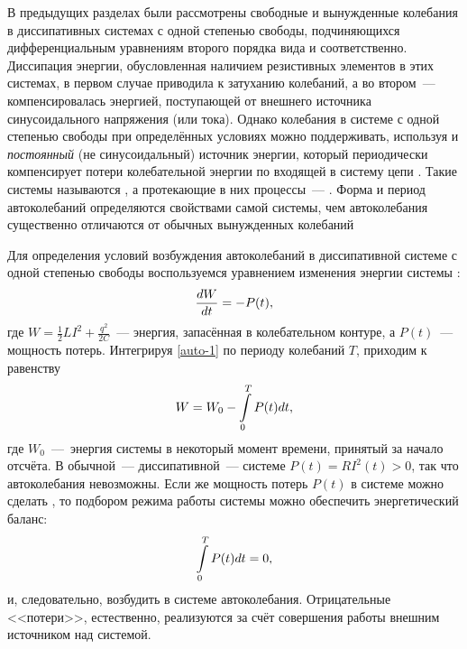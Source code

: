 
В предыдущих разделах были рассмотрены свободные и вынужденные колебания в
диссипативных системах с одной степенью свободы, подчиняющихся дифференциальным
уравнениям второго порядка вида  и 
соответственно. Диссипация энергии, обусловленная наличием резистивных элементов
в этих системах, в первом случае приводила к затуханию колебаний, а во
втором~--- компенсировалась энергией, поступающей от
внешнего источника синусоидального напряжения (или тока). Однако колебания в
системе с одной степенью свободы при определённых условиях можно поддерживать,
используя и \emph{постоянный} (не синусоидальный) источник энергии, 
который периодически компенсирует потери колебательной энергии по входящей 
в систему цепи . 
Такие системы называются , а протекающие в
них процессы~--- . Форма и период автоколебаний
определяются свойствами самой системы, чем автоколебания существенно отличаются
от обычных вынужденных колебаний

Для определения условий возбуждения автоколебаний в диссипативной системе с
одной степенью свободы воспользуемся уравнением изменения энергии 
системы :
\begin{equation}
	\eqmark{auto-1}
	\frac{dW}{dt}=-P(t),
\end{equation}
где $W=\frac12 LI^2+ \frac{q^2}{2C}$~--- энергия, запасённая в колебательном контуре,
а $P(t)$~--- мощность потерь. 
Интегрируя \eqref{auto-1} по периоду колебаний $T$, приходим 
к равенству
\begin{equation}
	\eqmark{auto-2}
	W=W_0-\int\limits_{0}^{T}P(t)dt,
\end{equation}
где $W_0$~---~энергия системы в некоторый момент времени, принятый за начало
отсчёта. В обычной~--- диссипативной~--- системе $P(t)=RI^{2}(t)>0$, 
так что автоколебания невозможны. 
Если же мощность потерь $P(t)$ в системе можно сделать , 
то подбором режима работы системы можно обеспечить энергетический баланс:
\begin{equation}
	\eqmark{auto-3}
	\int\limits_{0}^{T} P(t) dt = 0,
\end{equation}
и, следовательно, возбудить в системе автоколебания. Отрицательные
<<потери>>, естественно, реализуются за счёт совершения 
работы внешним источником над системой.

